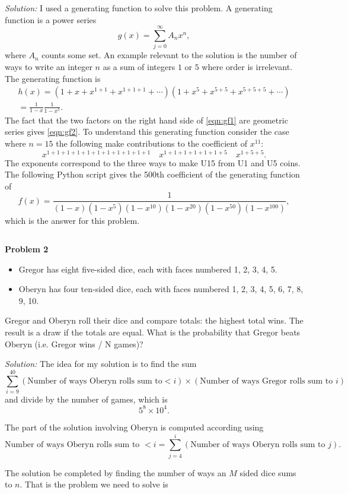 \documentclass{article}
\newcommand{\mintedpython}[1]{\inputminted[frame=lines,framesep=2mm,baselinestretch=1.2,bgcolor=LightGray,fontsize=\footnotesize,linenos]{python}{#1}}
\begin{document}
\bigskip
{\it Solution:} I used a generating function to solve this problem.  A generating function is a power series
\[g(x)=\sum_{j=0}^\infty A_n x^n,\]
where $A_n$ counts some set.  An example relevant to the solution is the number of ways to write an integer $n$ as a sum of integers $1$ or $5$ where order is irrelevant.  The generating function is
\begin{align}
h(x)=(1+x+x^{1+1}+x^{1+1+1}+\cdots)(1+x^5+x^{5+5}+x^{5+5+5}+\cdots) \label{eqn:gf1}\\
=\frac{1}{1-x}\frac{1}{1-x^5}. \label{eqn:gf2}
\end{align}
The fact that the two factors on the right hand side of \eqref{eqn:gf1} are geometric series gives \eqref{eqn:gf2}.  To understand this generating function consider the case where $n=15$ the following make contributions to the coefficient of $x^11$:
\[x^{1+1+1+1+1+1+1+1+1+1+1} \quad   x^{1+1+1+1+1+1+5}\quad   x^{1+5+5}. \]
The exponents correspond to the three ways to make U15 from U1 and U5 coins.  The following Python script gives the 500th coefficient of the generating function of 
\[f(x)=\frac{1}{(1-x)(1-x^5)(1-x^{10})(1-x^{20})(1-x^{50})(1-x^{100})},\]
which is the answer for this problem.


\mintedpython{Python_coding_challenge/problem1.py}

{\bf Problem 2} 
\begin{itemize}
\item Gregor has eight five-sided dice, each with faces numbered 1, 2, 3, 4, 5.
\item Oberyn has four ten-sided dice, each with faces numbered 1, 2, 3, 4, 5, 6, 7, 8, 9, 10.
\end{itemize}
Gregor and Oberyn roll their dice and compare totals: the highest total wins. The result is a draw if the
totals are equal.
What is the probability that Gregor beats Oberyn (i.e. Gregor wins / N games)?

\bigskip
{\it Solution:} The idea for my solution is to find the sum
\[ \sum_{i=9}^{40} (\text{Number of ways Oberyn rolls sum to}<i) \times (\text{Number of ways Gregor rolls sum to }i)\]
and divide by the number of games, which is 
\[5^8 \times 10^4.\]

The part of the solution involving Oberyn is computed according using
\[\text{Number of ways Oberyn rolls sum to }<i=\sum_{j=4}^i (\text{Number of ways Oberyn rolls sum to }j).\]

The solution be completed by finding the number of ways an $M$ sided dice sums to $n$.  That is the problem we need to solve is
\end{document}
